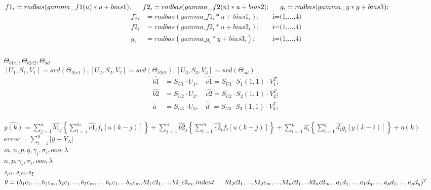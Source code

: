 \documentclass[12pt,a4paper]{report}
\begin{document}
$f1_i = radbas(gamma\_f1(u)*u+bias1);\\
\indent f2_i = radbas(gamma\_f2(u)*u+bias2);\\
\indent  g_i = radbas(gamma\_g*y+bias3);$\\

\begin{align*}
f1_i &= radbas(gamma\_f1_i*u+bias1_i);\quad &\text{i=(1,...,4)}\\
f2_i &= radbas(gamma\_f2_i*u+bias2_i);\quad &\text{i=(1,...,4)}\\
g_i &= radbas(gamma\_g_i*y+bias3_i);\quad &\text{i=(1,...,4)}\\
\end{align*}


$\Theta_{b1c1},\Theta_{b2c2},\Theta_{ad}$\\

$[U_1,S_1,V_1]=svd(\Theta_{b1c1}),
[U_2,S_2,V_2]=svd(\Theta_{b2c2}),
[U_3,S_3,V_3]=svd(\Theta_{ad})$\\

\begin{align*}
\hat{b1}&=S_{U1}\cdot U_1,\quad \hat{c1}=S_{U1}\cdot S_1(1,1)\cdot V_1^T;\\
\hat{b2}&=S_{U2}\cdot U_2,\quad \hat{c2}=S_{U2}\cdot S_2(1,1)\cdot V_2^T;\\
\hat{a}&=S_{U3}\cdot U_3, \quad \hat{d}\,\,=S_{U3}\cdot S_3(1,1)\cdot V_3^T;
\end{align*} \\

$\hat{y(k)}=\sum\limits_{j=1}^n \hat{b1}_j\left \{  \sum\limits_{t=1}^m\hat{c1}_tf_t\left [ u(k-j) \right ]\right \}+\sum\limits_{j=1}^n \hat{b2}_j\left \{\sum\limits_{t=1}^m\hat{c2}_tf_t\left [u(k-j) \right ]\right \}+\sum\limits_{i=1}^p \hat{a_i}\left \{ \sum\limits_{l=1}^q\hat{d_l}g_l\left [ y(k-i) \right ]\right \} +\eta(k)$\\

$error = \sum\limits_{i=1}^n\left | \hat{y}-Y_N \right |$\\

$m,n,p,q,\gamma_i ,\sigma_i ,ooo,\lambda $\\

$n,p,\gamma_i ,\sigma_i ,ooo,\lambda$\\

$s_{\mu1},s_{\mu2},s_{\xi }$\\


$\theta =(b_1c_1,...,b_1c_m,b_2c_1,...,b_2c_m,...,b_nc_1,...b_nc_m, b2_1c2_1,...,b2_1c2_m,\\
\\indent\indent\, b2_2c2_1,...,b2_2c_m,...,b2_nc2_1,...b2_nc2_m,, a_1d_1,...,a_1d_q,...,a_pd_1,...,a_pd_q)^T$\\
\end{document}

